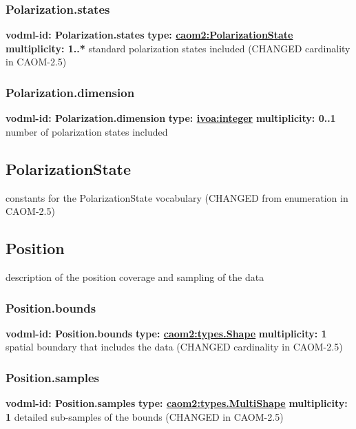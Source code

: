     \subsubsection{Polarization.states}
      \textbf{vodml-id: Polarization.states} \newline
      \textbf{type: \hyperref[sect:PolarizationState]{caom2:PolarizationState}} \newline
      \textbf{multiplicity: 1..*} \newline
      standard polarization states included (CHANGED cardinality in CAOM-2.5)

    \subsubsection{Polarization.dimension}
      \textbf{vodml-id: Polarization.dimension} \newline
      \textbf{type: \hyperref[sect:ivoa]{ivoa:integer}} \newline
      \textbf{multiplicity: 0..1} \newline
      number of polarization states included

  \subsection{PolarizationState}
  \label{sect:PolarizationState}
    constants for the PolarizationState vocabulary (CHANGED from enumeration in CAOM-2.5)

  \subsection{Position}
  \label{sect:Position}
    description of the position coverage and sampling of the data

    \subsubsection{Position.bounds}
      \textbf{vodml-id: Position.bounds} \newline
      \textbf{type: \hyperref[sect:types.Shape]{caom2:types.Shape}} \newline
      \textbf{multiplicity: 1} \newline
      spatial boundary that includes the data (CHANGED cardinality in CAOM-2.5)

    \subsubsection{Position.samples}
      \textbf{vodml-id: Position.samples} \newline
      \textbf{type: \hyperref[sect:types.MultiShape]{caom2:types.MultiShape}} \newline
      \textbf{multiplicity: 1} \newline
      detailed sub-samples of the bounds (CHANGED in CAOM-2.5)

